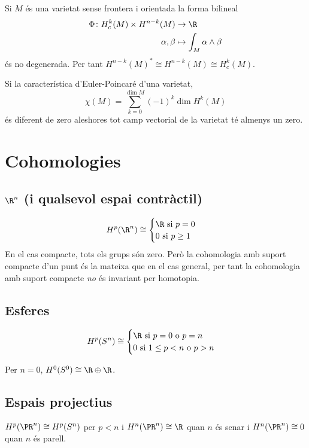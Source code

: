 \documentclass[12pt,twocolumn]{article}
\begin{document}
\begin{theorem}
	Si \( M \) és una varietat sense frontera i orientada la forma bilineal
	\begin{align*}
		\Phi \colon H_c^{k}(M) \times H^{n-k}(M) &  \to \R \\
		\alpha, \beta & \mapsto \int_M \alpha \wedge \beta
	\end{align*}
	és no degenerada. Per tant \( H^{n-k}(M)^\ast \cong H^{n-k}(M) \cong H^k_c(M)  \).
\end{theorem}

\begin{proposition}
	Si la característica d'Euler-Poincaré d'una varietat,
	\begin{equation*}
		\chi(M) = \sum_{k = 0}^{\dim M} (-1)^k \dim H^k(M) 
	\end{equation*}
	és diferent de zero aleshores tot camp vectorial de la varietat té almenys un zero. 
\end{proposition}

\section{Cohomologies}
\subsection{\( \R^n \) (i qualsevol espai contràctil)}
\begin{equation*}
	H^p(\R^n) \cong \begin{cases}
		\R \text{ si } p = 0 \\
		0 \text{ si } p \geq 1
	\end{cases}
\end{equation*}
En el cas compacte, tots els grups són zero. Però la cohomologia amb suport compacte d'un
punt és la mateixa que en el cas general, per tant la cohomologia amb suport compacte
\emph{no} és invariant per homotopia.

\subsection{Esferes}
\begin{equation*}
	H^p(S^n) \cong \begin{cases}
		\R \text{ si } p = 0 \text{ o } p = n \\
		0 \text{ si }  1 \leq p < n \text{ o } p > n
	\end{cases}
\end{equation*}

Per \( n = 0 \), \( H^0(S^0) \cong \R \oplus \R \). 

\subsection{Espais projectius}
\( H^p(\PR^n) \cong H^p(S^n) \) per \( p < n \) i \( H^n(\PR^n) \cong \R \) quan \( n \)
és senar i \( H^n(\PR^n) \cong 0 \) quan \( n \) és parell.
\end{document}

